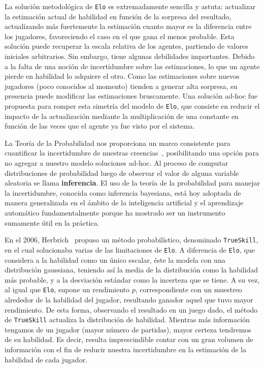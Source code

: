 \documentclass[11pt,twoside,spanish]{report} %
\begin{document}
La soluci\'on metodol\'ogica de \texttt{Elo} es extremadamente sencilla y astuta: actualizar la estimaci\'on actual de habilidad en funci\'on de la sorpresa del resultado, actualizando m\'as fuertemente la estimaci\'on cuanto mayor es la diferencia entre los jugadores, favoreciendo el caso en el que gana el menos probable.
Esta soluci\'on puede recuperar la escala relativa de los agentes, partiendo de valores iniciales arbitrarios.
Sin embargo, tiene algunas debilidades importantes.
Debido a la falta de una noci\'on de incertidumbre sobre las estimaciones, lo que un agente pierde en habilidad lo adquiere el otro.
Como las estimaciones sobre nuevos jugadores (poco conocidos al momento) tienden a generar alta sorpresa, su presencia puede modificar las estimaciones bruscamente.
Una soluci\'on ad-hoc fue propuesta para romper esta simetr\'ia del modelo de \texttt{Elo}, que consiste en reducir el impacto de la actualizaci\'on mediante la multiplicaci\'on de una constante en funci\'on de las veces que el agente ya fue visto por el sistema.

La Teor\'ia de la Probabilidad nos proporciona un marco consistente para cuantificar la incertidumbre de nuestras creencias~\cite{Bishop2006}, posibilitando una opci\'on para no agregar a nuestro modelo soluciones ad-hoc.
Al proceso de computar distribuciones de probabilidad luego de observar el valor de alguna variable aleatoria se llama \textbf{inferencia}.
El uso de la teor\'ia de la probabilidad para manejar la incertidumbre, conocida como inferencia bayesiana, est\'a hoy adoptada de manera generalizada en el \'ambito de la inteligencia artificial y el aprendizaje autom\'atico fundamentalmente porque ha mostrado ser un instrumento sumamente \'util en la pr\'actica.

En el 2006, Herbrich~\cite{Herbrich2007} propuso un m\'etodo probabil\'istico, denominado \texttt{TrueSkill}, en el cual solucionaba varias de las limitaciones de \texttt{Elo}.
A diferencia de \texttt{Elo}, que considera a la habilidad como un \'unico escalar, \'este la modela con una distribuci\'on gaussiana, teniendo as\'i la media de la distribuci\'on como la habilidad m\'as probable, y a la desviaci\'on est\'andar como la incerteza que se tiene.
A su vez, al igual que \texttt{Elo}, supone un rendimiento $p$, correspondiente con un muestreo alrededor de la habilidad del jugador, resultando ganador aquel que tuvo mayor rendimiento.
De esta forma, observando el resultado en un juego dado, el m\'etodo de \texttt{TrueSkill} actualiza la distribuci\'on de habilidad.
Mientras m\'as informaci\'on tengamos de un jugador (mayor n\'umero de partidas), mayor certeza tendremos de su habilidad.
Es decir, resulta imprescindible contar con un gran volumen de informaci\'on con el fin de reducir nuestra incertidumbre en la estimaci\'on de la habilidad de cada jugador.
\end{document}

